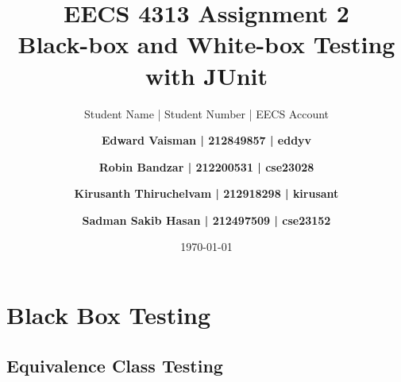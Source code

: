 \documentclass[fontsize=12pt,paper=letter,twoside]{scrartcl}
\author{Student Name | Student Number | EECS Account
\and \textbf{Edward Vaisman | 212849857 | eddyv}
\and \textbf{Robin Bandzar | 212200531 | cse23028}
\and \textbf{Kirusanth Thiruchelvam | 212918298 | kirusant}
\and \textbf{Sadman Sakib Hasan | 212497509 | cse23152}
}
\date{\today} %
\begin{document}
\title{EECS 4313 Assignment 2 \\Black-box and White-box Testing with JUnit}
\maketitle

\newpage

\tableofcontents


\newpage



\section{Black Box Testing}

\subsection {Equivalence Class Testing}
\end{document}

